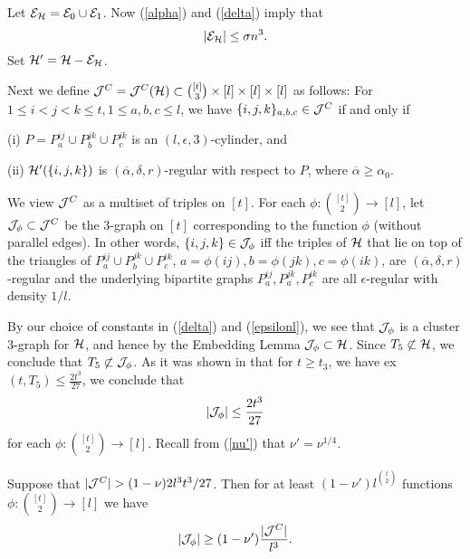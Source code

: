 \documentclass[11pt]{article}
\begin{document}
  Let ${\cal E}_{\mathcal{H}}={\cal E}_0\cup {\cal E}_1$.
  Now (\ref{alpha}) and (\ref{delta}) imply that
\begin{equation}\label{rhoupp}|\cE_{\HH}|\le \sigma n^3.\end{equation} Set
$\mathcal{H}'=\mathcal{H}-{\cal E}_{\mathcal{H}}$.


Next we define ${\cal J}^C={\cal J}^C(\mathcal{H})\subset \binom{[t]}{3} \times [l]
\times [l] \times [l]$ as follows: For $1 \le i <j <k \le t, 1 \le
a,b,c \le l$,  we have $\{i,j,k\}_{a,b,c} \in {\cal J}^C$ if and only if

(i) $P=P_a^{ij} \cup P_b^{jk} \cup P_c^{ik}$ is an $(l, \epsilon,
3)$-cylinder, and

(ii) $\mathcal{H}'(\{i,j,k\})$ is $(\overline{\alpha}, \delta, r)$-regular
with respect to $P$, where $\overline{\alpha}\ge \alpha_0$.

We view ${\cal J}^C$ as a multiset of triples on $[t]$. For each
$\phi:\binom{[t]}{2} \rightarrow [l]$, let ${\cal J}_{\phi}\subset {\cal J}^C$ be the
$3$-graph on $[t]$ corresponding to the function $\phi$ (without
parallel edges). In other words, $\{i,j,k\} \in {\cal J}_{\phi}$ iff the
triples of $\mathcal{H}$ that lie on top of the triangles of $P_{a}^{ij}
\cup P_{b}^{jk} \cup P_{c}^{ik}$, $a=\phi(ij), b=\phi(jk),
c=\phi(ik)$, are $(\overline{\alpha}, \delta, r)$-regular and the
underlying bipartite graphs $P_{a}^{ij}, P_{a}^{jk}, P_{c}^{ik}$ are
all $\epsilon$-regular with density $1/l$.

By our choice of constants in (\ref{delta}) and (\ref{epsilonl}),
 we see that ${\cal J}_{\phi}$ is a cluster $3$-graph for $\mathcal{H}$, and
  hence by the Embedding Lemma ${\cal J}_{\phi} \subset \mathcal{H}$. Since $T_5 \not\subset \mathcal{H}$, we conclude that $T_5 \not\subset {\cal J}_{\phi}$.
   As it was shown in \cite{FPS} that for $t \ge t_3$, we have ex$(t, T_5)\le \frac{2t^3}{27}$,
     we conclude that
     \begin{equation}\label{jphi}
    |\cJ_{\phi}|\le \frac{2t^3}{27}\end{equation}
for each $\phi :{[t]\choose 2} \rightarrow [l]$.  Recall from (\ref{nu'}) that $\nu'=\nu^{1/4}$.

\begin{lemma}\label{fact} Suppose that $|\cJ^C|>(1-\nu){2l^3t^3}/{27}$.  Then for at least $(1-\nu') l^{{t \choose 2}}$
functions $\phi:\binom{[t]}{2} \rightarrow [l]$ we have
$$|{\cal J}_{\phi}| \ge (1-\nu')\frac{|{\cal J}^C|}{l^3}.$$
\end{lemma}
\end{document}
